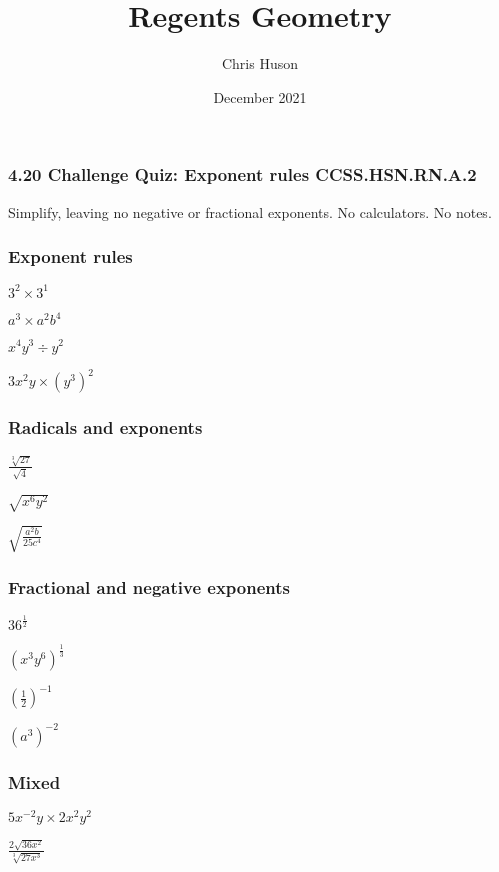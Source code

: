 \documentclass[12pt, twoside]{article}
\title{Regents Geometry}
\author{Chris Huson}
\date{December 2021}
\begin{document}
\subsubsection*{4.20 Challenge Quiz: Exponent rules \hfill CCSS.HSN.RN.A.2}
Simplify, leaving no negative or fractional exponents. No calculators. No notes.
\begin{enumerate}[itemsep=2cm]
\subsubsection*{Exponent rules}  
  \begin{multicols}{2}
    \item $3^2 \times 3^1$
    \item $\displaystyle a^{3} \times a^2 b^4$
    \item $x^4 y^{3} \div y^{2}$
    \item $3x^2 y \times (y^3)^2$
  \end{multicols} \vspace{1cm}

\subsubsection*{Radicals and exponents}
  \begin{multicols}{3}  
    \item $\displaystyle \frac{\sqrt[3]{27}}{\sqrt{4}}$
    \item $\sqrt{x^6 y^2}$
    \item $\displaystyle  \sqrt{\frac{a^2 b}{25c^{4}}}$
    \end{multicols} \vspace{2cm}

\subsubsection*{Fractional and negative exponents}
  \begin{multicols}{2}  
    \item $\displaystyle  36^\frac{1}{2}$
    \item $\displaystyle  (x^3 y^6)^\frac{1}{3}$
    \item $\displaystyle  \left(\frac{1}{2}\right)^{-1}$
    \item $\displaystyle  (a^3)^{-2}$
  \end{multicols} \vspace{1cm}

  \subsubsection*{Mixed}
  \begin{multicols}{2}  
    \item $5x^{-2}y \times 2x^2y^{2}$
    \item $\displaystyle  \frac{2 \sqrt{36x^2}}{\sqrt[3]{27x^{3}}}$
  \end{multicols}

\end{enumerate}
\end{document}
